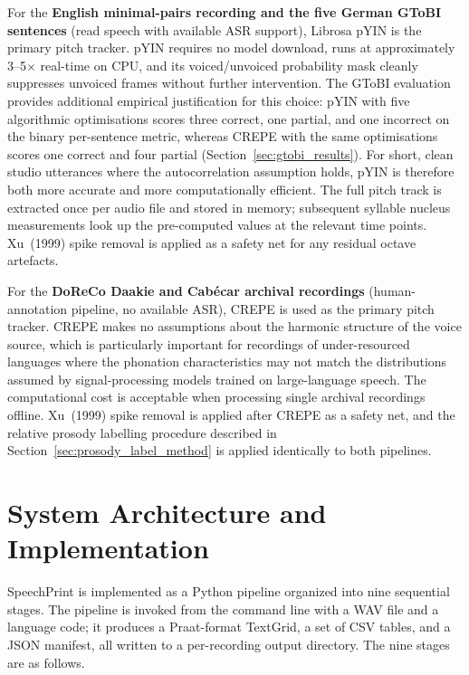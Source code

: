 For the \textbf{English minimal-pairs recording and the five German GToBI
sentences} (read speech with available ASR support), Librosa pYIN is the primary
pitch tracker. pYIN requires no model download, runs at approximately
3--5$\times$ real-time on CPU, and its voiced/unvoiced probability mask cleanly
suppresses unvoiced frames without further intervention. The GToBI evaluation
provides additional empirical justification for this choice: pYIN with five
algorithmic optimisations scores three correct, one partial, and one incorrect
on the binary per-sentence metric, whereas CREPE with the same optimisations
scores one correct and four partial (Section~\ref{sec:gtobi_results}). For
short, clean studio utterances where the autocorrelation assumption holds,
pYIN is therefore both more accurate and more computationally efficient.
The full pitch track is extracted once per audio file and stored in memory;
subsequent syllable nucleus measurements look up the pre-computed values at
the relevant time points. Xu~(1999) spike removal is applied as a safety net
for any residual octave artefacts.

For the \textbf{DoReCo Daakie and Cabécar archival recordings}
(human-annotation pipeline, no available ASR), CREPE is used as the primary
pitch tracker. CREPE makes no assumptions about the harmonic structure of the
voice source, which is particularly important for recordings of
under-resourced languages where the phonation characteristics may not match
the distributions assumed by signal-processing models trained on large-language
speech. The computational cost is acceptable when processing single archival
recordings offline. Xu~(1999) spike removal is applied after CREPE as a safety
net, and the relative prosody labelling procedure described in
Section~\ref{sec:prosody_label_method} is applied identically to both
pipelines.


\section{System Architecture and Implementation}
\label{sec:implementation}

SpeechPrint is implemented as a Python pipeline organized into nine sequential
stages. The pipeline is invoked from the command line with a WAV file and a
language code; it produces a Praat-format TextGrid, a set of CSV tables, and a
JSON manifest, all written to a per-recording output directory. The nine stages
are as follows.

